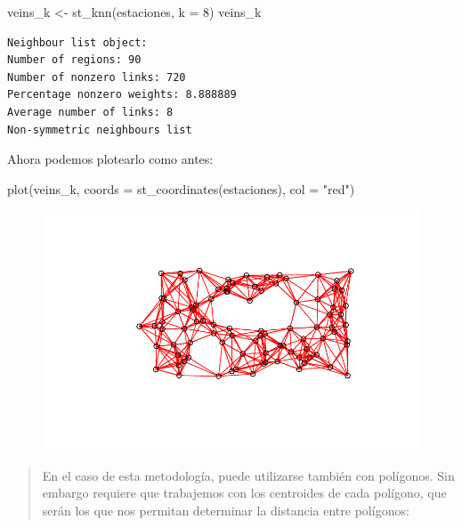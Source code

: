 \documentclass[
  letterpaper,
  DIV=11,
  numbers=noendperiod]{scrreprt}
\newenvironment{Shaded}{\begin{snugshade}}{\end{snugshade}}
\newcommand{\AttributeTok}[1]{\textcolor[rgb]{0.40,0.45,0.13}{#1}}
\newcommand{\DecValTok}[1]{\textcolor[rgb]{0.68,0.00,0.00}{#1}}
\newcommand{\FunctionTok}[1]{\textcolor[rgb]{0.28,0.35,0.67}{#1}}
\newcommand{\NormalTok}[1]{\textcolor[rgb]{0.00,0.23,0.31}{#1}}
\newcommand{\OtherTok}[1]{\textcolor[rgb]{0.00,0.23,0.31}{#1}}
\newcommand{\StringTok}[1]{\textcolor[rgb]{0.13,0.47,0.30}{#1}}
\begin{document}
\begin{Shaded}
\begin{Highlighting}[]
\NormalTok{veins\_k }\OtherTok{\textless{}{-}} \FunctionTok{st\_knn}\NormalTok{(estaciones, }\AttributeTok{k =} \DecValTok{8}\NormalTok{)}
\NormalTok{veins\_k}
\end{Highlighting}
\end{Shaded}

\begin{verbatim}
Neighbour list object:
Number of regions: 90 
Number of nonzero links: 720 
Percentage nonzero weights: 8.888889 
Average number of links: 8 
Non-symmetric neighbours list
\end{verbatim}

Ahora podemos plotearlo como antes:

\begin{Shaded}
\begin{Highlighting}[]
\FunctionTok{plot}\NormalTok{(veins\_k, }\AttributeTok{coords =} \FunctionTok{st\_coordinates}\NormalTok{(estaciones), }\AttributeTok{col =} \StringTok{"red"}\NormalTok{)}
\end{Highlighting}
\end{Shaded}

\begin{figure}[H]

{\centering \includegraphics{04_AutocorrelacionEspacial_files/figure-pdf/unnamed-chunk-5-1.pdf}

}

\end{figure}

\begin{quote}
En el caso de esta metodología, puede utilizarse también con polígonos.
Sin embargo requiere que trabajemos con los centroides de cada polígono,
que serán los que nos permitan determinar la distancia entre polígonos:
\end{quote}
\end{document}

